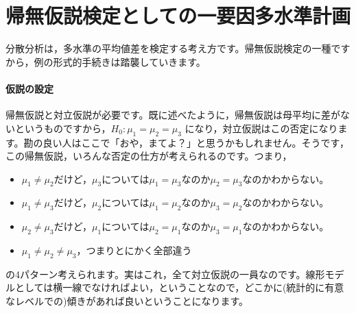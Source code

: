 \documentclass{ltjsarticle}
\begin{document}



\section{帰無仮説検定としての一要因多水準計画}
分散分析は，多水準の平均値差を検定する考え方です。帰無仮説検定の一種ですから，例の形式的手続きは踏襲していきます。
\paragraph{仮説の設定}帰無仮説と対立仮説が必要です。既に述べたように，帰無仮説は母平均に差がないというものですから，$H_0 : \mu_1 = \mu_2 = \mu_3$ になり，対立仮説はこの否定になります。勘の良い人はここで「おや，まてよ？」と思うかもしれません。そうです，この帰無仮説，いろんな否定の仕方が考えられるのです。つまり，
\begin{itemize}
    \item $\mu_1 \neq \mu_2$だけど，$\mu_3$については$\mu_1=\mu_3$なのか$\mu_2=\mu_3$なのかわからない。
    \item $\mu_1 \neq \mu_3$だけど，$\mu_2$については$\mu_1=\mu_2$なのか$\mu_3=\mu_2$なのかわからない。
    \item $\mu_2 \neq \mu_3$だけど，$\mu_1$については$\mu_2=\mu_1$なのか$\mu_3=\mu_1$なのかわからない。
    \item $\mu_1 \neq \mu_2 \neq \mu_3$，つまりとにかく全部違う
\end{itemize}
の4パターン考えられます。実はこれ，全て対立仮説の一員なのです。線形モデルとしては横一線でなければよい，ということなので，どこかに(統計的に有意なレベルでの)傾きがあれば良いということになります。
\end{document}
